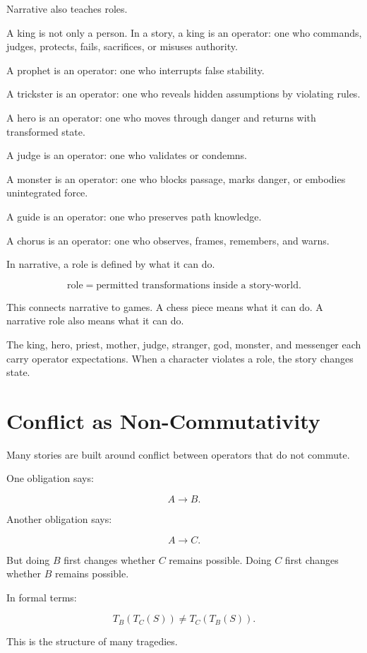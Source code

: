\documentclass[11pt]{book}
\begin{document}
Narrative also teaches roles.

A king is not only a person. In a story, a king is an operator: one who commands, judges, protects, fails, sacrifices, or misuses authority.

A prophet is an operator: one who interrupts false stability.

A trickster is an operator: one who reveals hidden assumptions by violating rules.

A hero is an operator: one who moves through danger and returns with transformed state.

A judge is an operator: one who validates or condemns.

A monster is an operator: one who blocks passage, marks danger, or embodies unintegrated force.

A guide is an operator: one who preserves path knowledge.

A chorus is an operator: one who observes, frames, remembers, and warns.

In narrative, a role is defined by what it can do.

\[
\text{role} = \text{permitted transformations inside a story-world}.
\]

This connects narrative to games. A chess piece means what it can do. A narrative role also means what it can do.

The king, hero, priest, mother, judge, stranger, god, monster, and messenger each carry operator expectations. When a character violates a role, the story changes state.

\section{Conflict as Non-Commutativity}

Many stories are built around conflict between operators that do not commute.

One obligation says:

\[
A \rightarrow B.
\]

Another obligation says:

\[
A \rightarrow C.
\]

But doing \(B\) first changes whether \(C\) remains possible. Doing \(C\) first changes whether \(B\) remains possible.

In formal terms:

\[
T_B(T_C(S)) \neq T_C(T_B(S)).
\]

This is the structure of many tragedies.
\end{document}
